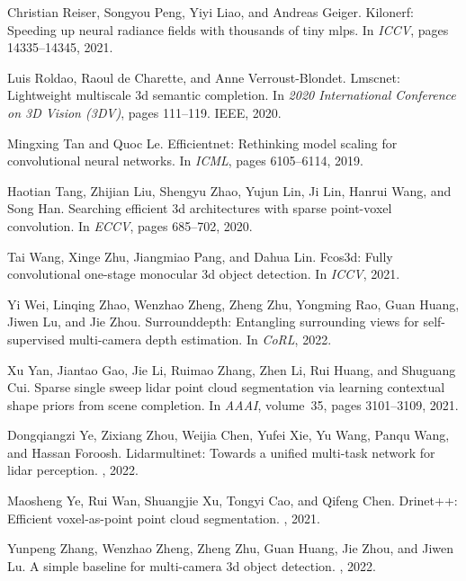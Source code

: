 \documentclass[10pt,twocolumn,letterpaper]{article}
\begin{document}
{\begin{thebibliography}{10}
Christian Reiser, Songyou Peng, Yiyi Liao, and Andreas Geiger.
\newblock Kilonerf: Speeding up neural radiance fields with thousands of tiny
  mlps.
\newblock In {\em ICCV}, pages 14335--14345, 2021.

Luis Roldao, Raoul de Charette, and Anne Verroust-Blondet.
\newblock Lmscnet: Lightweight multiscale 3d semantic completion.
\newblock In {\em 2020 International Conference on 3D Vision (3DV)}, pages
  111--119. IEEE, 2020.

Mingxing Tan and Quoc Le.
\newblock Efficientnet: Rethinking model scaling for convolutional neural
  networks.
\newblock In {\em ICML}, pages 6105--6114, 2019.

Haotian Tang, Zhijian Liu, Shengyu Zhao, Yujun Lin, Ji Lin, Hanrui Wang, and
  Song Han.
\newblock Searching efficient 3d architectures with sparse point-voxel
  convolution.
\newblock In {\em ECCV}, pages 685--702, 2020.

Tai Wang, Xinge Zhu, Jiangmiao Pang, and Dahua Lin.
\newblock Fcos3d: Fully convolutional one-stage monocular 3d object detection.
\newblock In {\em ICCV}, 2021.

Yi Wei, Linqing Zhao, Wenzhao Zheng, Zheng Zhu, Yongming Rao, Guan Huang, Jiwen
  Lu, and Jie Zhou.
\newblock Surrounddepth: Entangling surrounding views for self-supervised
  multi-camera depth estimation.
\newblock In {\em CoRL}, 2022.

Xu Yan, Jiantao Gao, Jie Li, Ruimao Zhang, Zhen Li, Rui Huang, and Shuguang
  Cui.
\newblock Sparse single sweep lidar point cloud segmentation via learning
  contextual shape priors from scene completion.
\newblock In {\em AAAI}, volume~35, pages 3101--3109, 2021.

Dongqiangzi Ye, Zixiang Zhou, Weijia Chen, Yufei Xie, Yu Wang, Panqu Wang, and
  Hassan Foroosh.
\newblock Lidarmultinet: Towards a unified multi-task network for lidar
  perception.
, 2022.

Maosheng Ye, Rui Wan, Shuangjie Xu, Tongyi Cao, and Qifeng Chen.
\newblock Drinet++: Efficient voxel-as-point point cloud segmentation.
, 2021.

Yunpeng Zhang, Wenzhao Zheng, Zheng Zhu, Guan Huang, Jie Zhou, and Jiwen Lu.
\newblock A simple baseline for multi-camera 3d object detection.
, 2022.


\end{thebibliography}}
\end{document}
